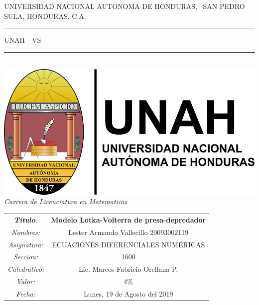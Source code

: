 \documentclass[10pt,letterpaper]{article}
\author{Lester Armando Vallecillo}
\begin{document}
\lstset{language=Matlab}
 \thispagestyle{empty} 

\begin{center}
\begin{LARGE}
UNIVERSIDAD NACIONAL AUTONOMA DE HONDURAS, 
\ SAN PEDRO SULA, HONDURAS, C.A.\\[0.5cm]
\end{LARGE}	
\rule{50mm}{0.1mm} UNAH - VS \ \rule{50mm}{0.1mm} \\[0.5cm]

\includegraphics[scale=0.2]{Pic/Dlogounah.jpg}\\[1cm]

\textit{{\LARGE Carrera de Licenciatura en Matematicas}}\\[0.5cm]

\begin{large}
\begin{tabular}{ c     c }

\rule[-1ex]{0pt}{7ex} \emph{{\LARGE \textbf{Titulo}: }} & {\textbf{Modelo Lotka-Volterra de presa-depredador}}\\ 
	
\rule[-1ex]{0pt}{7ex} \emph{{\LARGE Nombres: }} & {Lester Armando Vallecillo} {\hspace*{1cm} 20093002119}\\ 

\rule[-1ex]{0pt}{7ex} \emph{{\LARGE Asignatura:}} & {ECUACIONES DIFERENCIALES NUMÉRICAS} \\ 
 
\rule[-1ex]{0pt}{7ex} \emph{{\LARGE Seccion:}} & { 1600} \\

\rule[-1ex]{0pt}{7ex} \emph{{\LARGE Catedratico:}} & { Lic. Marcos Fabricio Orellana P.} \\ 
  
\rule[-1ex]{0pt}{7ex} \emph{{\LARGE Valor:}} & { 4\%} \\ 
 
\rule[-1ex]{0pt}{7ex} \emph{{\LARGE Fecha:}} & {Lunes, 19 de Agosto del 2019}\\ 

\end{tabular} 
\end{large}
 \end{center} 
\end{document}

